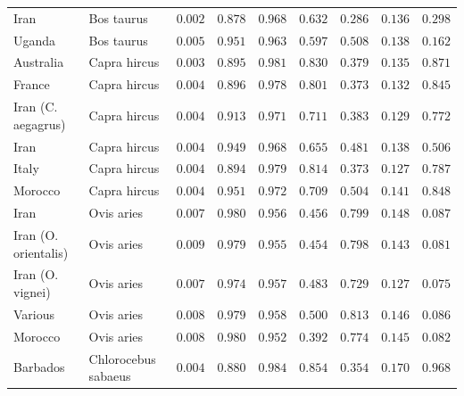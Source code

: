 \documentclass{article}
\begin{document}
\begin{center}
\begin{adjustbox}{width=\textwidth}
\begin{tabular}{||l|l|r||r|r||r|r||r|r||}
                Iran               & Bos taurus        & $ 0.002$ & $ 0.878$ & $ 0.968$ & $ 0.632$ & $ 0.286$ & $ 0.136$ & $ 0.298$ \\
                Uganda              & Bos taurus        & $ 0.005$ & $ 0.951$ & $ 0.963$ & $ 0.597$ & $ 0.508$ & $ 0.138$ & $ 0.162$ \\
                \rowcolor{LIGHTGREY} Australia            & Capra hircus        & $ 0.003$ & $ 0.895$ & $ 0.981$ & $ 0.830$ & $ 0.379$ & $ 0.135$ & $ 0.871$ \\
                \rowcolor{LIGHTGREY} France                                    & Capra hircus          & $ 0.004$ & $ 0.896$ & $ 0.978$ & $ 0.801$ & $ 0.373$ & $ 0.132$ & $ 0.845$ \\
                \rowcolor{LIGHTGREY} Iran (C. aegagrus)                    & Capra hircus          & $ 0.004$ & $ 0.913$ & $ 0.971$ & $ 0.711$ & $ 0.383$ & $ 0.129$ & $ 0.772$ \\
                \rowcolor{LIGHTGREY} Iran                        & Capra hircus          & $ 0.004$ & $ 0.949$ & $ 0.968$ & $ 0.655$ & $ 0.481$ & $ 0.138$ & $ 0.506$ \\
                \rowcolor{LIGHTGREY} Italy                                 & Capra hircus          & $ 0.004$ & $ 0.894$ & $ 0.979$ & $ 0.814$ & $ 0.373$ & $ 0.127$ & $ 0.787$ \\
                \rowcolor{LIGHTGREY} Morocco                                 & Capra hircus          & $ 0.004$ & $ 0.951$ & $ 0.972$ & $ 0.709$ & $ 0.504$ & $ 0.141$ & $ 0.848$ \\
                Iran           & Ovis aries & $ 0.007$ & $ 0.980$ & $ 0.956$ & $ 0.456$ & $ 0.799$ & $ 0.148$ & $ 0.087$ \\
                Iran (O. orientalis)  & Ovis aries & $ 0.009$ & $ 0.979$ & $ 0.955$ & $ 0.454$ & $ 0.798$ & $ 0.143$ & $ 0.081$ \\
                Iran (O. vignei)           & Ovis aries & $ 0.007$ & $ 0.974$ & $ 0.957$ & $ 0.483$ & $ 0.729$ & $ 0.127$ & $ 0.075$ \\
                Various             & Ovis aries & $ 0.008$ & $ 0.979$ & $ 0.958$ & $ 0.500$ & $ 0.813$ & $ 0.146$ & $ 0.086$ \\
                Morocco              & Ovis aries & $ 0.008$ & $ 0.980$ & $ 0.952$ & $ 0.392$ & $ 0.774$ & $ 0.145$ & $ 0.082$ \\
                \rowcolor{LIGHTGREY} Barbados              & Chlorocebus sabaeus & $ 0.004$ & $ 0.880$ & $ 0.984$ & $ 0.854$ & $ 0.354$ & $ 0.170$ & $ 0.968$ \\

\end{tabular}
\end{adjustbox}
\end{center}
\end{document}
